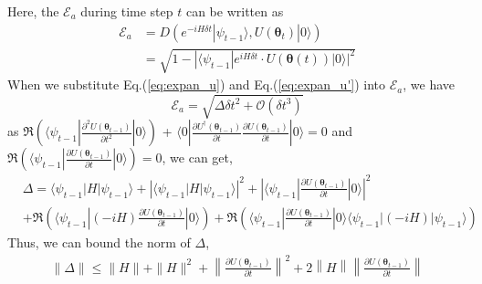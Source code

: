 \documentclass[twocolumn,
pra,aps,superscriptaddress,showpacs,amsmath,amssymb]{revtex4-2}
\begin{document}
Here, the $\mathcal{E}_a$ during time step $t$ can be written as
\begin{align}
\mathcal{E}_a &= D(e^{-iH\delta t}|\psi_{t-1}\rangle, U(\bm{\theta}_t)|0\rangle)\\
& = \sqrt{1 - |\langle \psi_{t-1}| e^{iH\delta t}\cdot U(\bm{\theta}(t))|0\rangle|^2}
\end{align}
When we substitute Eq.(\ref{eq:expan_u}) and Eq.(\ref{eq:expan_u'}) into $\mathcal{E}_a$, we have
\begin{equation}
    \mathcal{E}_a = \sqrt{\Delta \delta t^2 + \mathcal{O}(\delta t^3)}
\end{equation}
as $\Re\left(\langle \psi_{t-1}|\frac{\partial^2 U(\bm{\theta}_{t-1})}{\partial t^2}|0\rangle\right)$ + $\langle 0|\frac{\partial U^\dagger(\bm{\theta}_{t-1})}{\partial t}\frac{\partial U(\bm{\theta}_{t-1})}{\partial t}|0\rangle = 0$ and $\Re\left(\langle \psi_{t-1}|\frac{\partial U(\bm{\theta}_{t-1})}{\partial t}|0\rangle\right) = 0$, we can get,
\begin{align}
    &\Delta = \langle \psi_{t-1}|H|\psi_{t-1}\rangle + \left|\langle \psi_{t-1}|H|\psi_{t-1}\rangle\right|^2 + \left|\langle \psi_{t-1}|\frac{\partial U(\bm{\theta}_{t-1})}{\partial t}|0\rangle \right|^2 \nonumber \\
    &+ \Re\left(\langle\psi_{t-1}|(-iH)\frac{\partial U(\bm{\theta}_{t-1})}{\partial t}|0\rangle\right) 
    + \Re\left(\langle \psi_{t-1}|\frac{\partial U(\bm{\theta}_{t-1})}{\partial t}|0\rangle \langle \psi_{t-1}|(-iH)|\psi_{t-1}\rangle\right) 
\end{align}
Thus, we can bound the norm of $\Delta$,
\begin{align}
    \|\Delta\| \leq \|H\|+ \|H\|^2 + \left\|\frac{\partial U(\bm{\theta}_{t-1})}{\partial t}\right\|^2+2\left\|H\right\|\left\|\frac{\partial U(\bm{\theta}_{t-1})}{\partial t}\right\|
\end{align}
\end{document}
